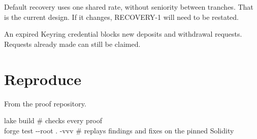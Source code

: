 \documentclass[10.5pt,a4paper]{article}
\newcommand{\lead}[1]{{\color{muted}\fontsize{10}{14}\selectfont #1}\par\vspace{4pt}}
\newcommand{\mut}[1]{\textcolor{muted}{#1}}
\begin{document}
Default recovery uses one shared rate, without seniority between tranches. That is the current design. If it changes, RECOVERY-1 will need to be restated.

An expired Keyring credential blocks new deposits and withdrawal requests. Requests already made can still be claimed.

\section{Reproduce}
\lead{From the proof repository.}

\begin{tcolorbox}[enhanced,colback=head,colframe=rule,boxrule=0.5pt,arc=4pt,left=10pt,right=10pt,top=7pt,bottom=7pt]
\ttfamily\fontsize{8.6}{13}\selectfont
lake build \hfill\mut{\# checks every proof}\\
forge test -{}-root . -vvv \hfill\mut{\# replays findings and fixes on the pinned Solidity}
\end{tcolorbox}
\end{document}
